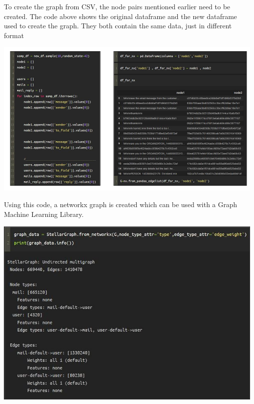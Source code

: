 To create the graph from CSV, the node pairs mentioned earlier need to be created. The code above shows the original dataframe and the new dataframe used to create the graph. They both contain the same data, just in different format
\begin{center}
\includegraphics[scale=0.75]{Appendices/image2_graph.JPG}
\end{center}

Using this code, a networkx graph is created which can be used with a Graph Machine Learning Library.

\begin{center}
\includegraphics[scale=0.75]{Appendices/image3_graph.JPG}
\end{center}


